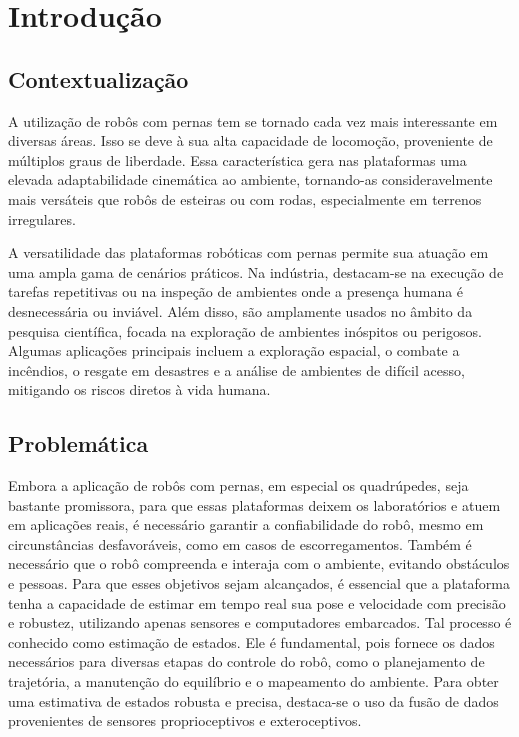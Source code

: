 \chapter{Introdução}

\section{Contextualização}

A utilização de robôs com pernas tem se tornado cada vez mais interessante em diversas áreas. Isso se deve à sua alta capacidade de locomoção, proveniente de múltiplos graus de liberdade. Essa característica gera nas plataformas uma elevada adaptabilidade cinemática ao ambiente, tornando-as consideravelmente mais versáteis que robôs de esteiras ou com rodas, especialmente em terrenos irregulares.

A versatilidade das plataformas robóticas com pernas permite sua atuação em uma ampla gama de cenários práticos. Na indústria, destacam-se na execução de tarefas repetitivas ou na inspeção de ambientes onde a presença humana é desnecessária ou inviável. Além disso, são amplamente usados no âmbito da pesquisa científica, focada na exploração de ambientes inóspitos ou perigosos. Algumas aplicações principais incluem a exploração espacial, o combate a incêndios, o resgate em desastres e a análise de ambientes de difícil acesso, mitigando os riscos diretos à vida humana.

\section{Problemática}

Embora a aplicação de robôs com pernas, em especial os quadrúpedes, seja bastante promissora, para que essas plataformas deixem os laboratórios e atuem em aplicações reais, é necessário garantir a confiabilidade do robô, mesmo em circunstâncias desfavoráveis, como em casos de escorregamentos. Também é necessário que o robô compreenda e interaja com o ambiente, evitando obstáculos e pessoas. Para que esses objetivos sejam alcançados, é essencial que a plataforma tenha a capacidade de estimar em tempo real sua pose e velocidade com precisão e robustez, utilizando apenas sensores e computadores embarcados. Tal processo é conhecido como estimação de estados. Ele é fundamental, pois fornece os dados necessários para diversas etapas do controle do robô, como o planejamento de trajetória, a manutenção do equilíbrio e o mapeamento do ambiente. Para obter uma estimativa de estados robusta e precisa, destaca-se o uso da fusão de dados provenientes de sensores proprioceptivos e exteroceptivos.

